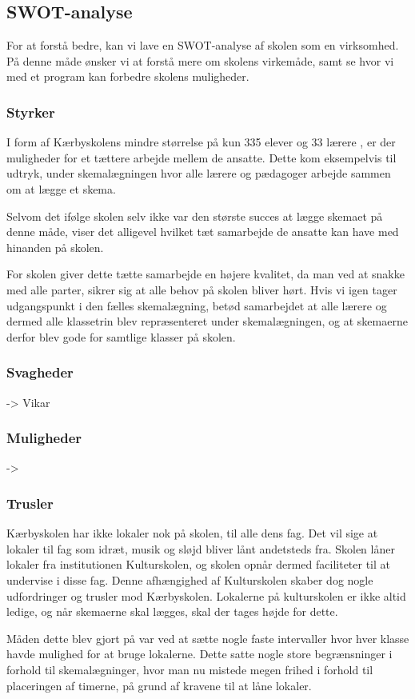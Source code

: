\subsection{SWOT-analyse}
For at forstå \school bedre, kan vi lave en SWOT-analyse af skolen som en virksomhed. På denne måde ønsker vi at forstå mere om skolens virkemåde, samt se hvor vi med et program kan forbedre skolens muligheder.

\subsubsection*{Styrker}
I form af Kærbyskolens mindre størrelse på kun 335 elever og 33 lærere \cite{Kaerbyskolens-laerere}, er der muligheder for et tættere arbejde mellem de ansatte. Dette kom eksempelvis til udtryk, under skemalægningen hvor alle lærere og pædagoger arbejde sammen om at lægge et skema.

Selvom det ifølge skolen selv ikke var den største succes at lægge skemaet på denne måde, viser det alligevel hvilket tæt samarbejde de ansatte kan have med hinanden på skolen.

For skolen giver dette tætte samarbejde en højere kvalitet, da man ved at snakke med alle parter, sikrer sig at alle behov på skolen bliver hørt. Hvis vi igen tager udgangspunkt i den fælles skemalægning, betød samarbejdet at alle lærere og dermed alle klassetrin blev repræsenteret under skemalægningen, og at skemaerne derfor blev gode for samtlige klasser på skolen. 

\subsubsection*{Svagheder}
    -> Vikar 

\subsubsection*{Muligheder}
	-> 

\subsubsection*{Trusler}
Kærbyskolen har ikke lokaler nok på skolen, til alle dens fag. Det vil sige at lokaler til fag som idræt, musik og sløjd bliver lånt andetsteds fra. Skolen låner lokaler fra institutionen Kulturskolen, og skolen opnår dermed faciliteter til at undervise i disse fag. Denne afhængighed af Kulturskolen skaber dog nogle udfordringer og trusler mod Kærbyskolen. Lokalerne på kulturskolen er ikke altid ledige, og når skemaerne skal lægges, skal der tages højde for dette. 

Måden dette blev gjort på var ved at sætte nogle faste intervaller hvor hver klasse havde mulighed for at bruge lokalerne. Dette satte nogle store begrænsninger i forhold til skemalægninger, hvor man nu mistede megen frihed i forhold til placeringen af timerne, på grund af kravene til at låne lokaler. 